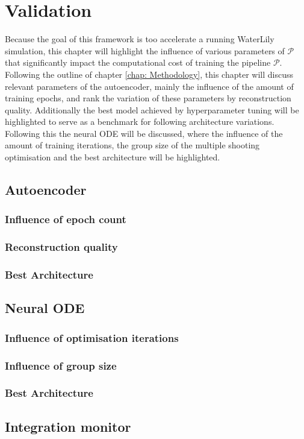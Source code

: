 \chapter{Validation}

Because the goal of this framework is too accelerate a running WaterLily simulation, this chapter will highlight the influence of various parameters of $\mathcal{P}$ that significantly impact the computational cost of training the pipeline $\mathcal{P}$. Following the outline of chapter \ref{chap: Methodology}, this chapter will discuss relevant parameters of the autoencoder, mainly the influence of the amount of training epochs, and rank the variation of these parameters by reconstruction quality. Additionally the best model achieved by hyperparameter tuning will be highlighted to serve as a benchmark for following architecture variations. Following this the neural ODE will be discussed, where the influence of the amount of training iterations, the group size of the multiple shooting optimisation and the best architecture will be highlighted. 

\section{Autoencoder}

\subsection{Influence of epoch count}
\subsection{Reconstruction quality}
\subsection{Best Architecture}


\section{Neural ODE}
\subsection{Influence of optimisation iterations}
\subsection{Influence of group size}
\subsection{Best Architecture}

\section{Integration monitor}
